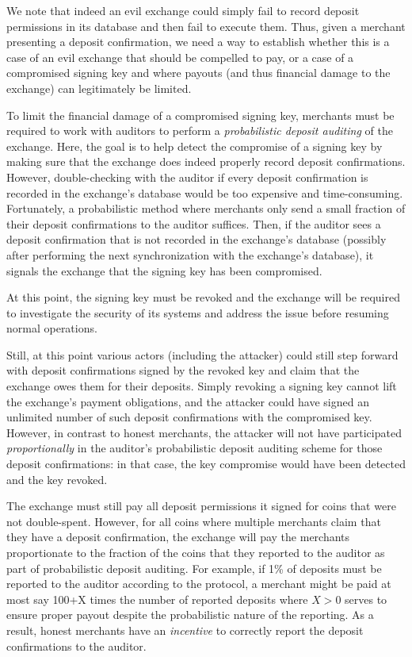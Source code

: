 We note that indeed an evil exchange could simply fail to record
deposit permissions in its database and then fail to execute them.
Thus, given a merchant presenting a deposit confirmation, we need
a way to establish whether this is a case of an evil exchange that
should be compelled to pay, or a case of a compromised signing key
and where payouts (and thus financial damage to the exchange)
can legitimately be limited.

To limit the financial damage of a compromised signing key, merchants
must be required to work with auditors to perform a
\emph{probabilistic deposit auditing} of the exchange.  Here, the goal
is to help detect the compromise of a signing key by making sure that
the exchange does indeed properly record deposit confirmations.
However, double-checking with the auditor if every deposit
confirmation is recorded in the exchange's database would be too
expensive and time-consuming.  Fortunately, a probabilistic method
where merchants only send a small fraction of their deposit
confirmations to the auditor suffices.  Then, if the auditor sees a
deposit confirmation that is not recorded in the exchange's database
(possibly after performing the next synchronization with the
exchange's database), it signals the exchange that the signing key has
been compromised.

At this point, the signing key must be revoked and the exchange will
be required to investigate the security of its systems and address the
issue before resuming normal operations.
%

Still, at this point various actors (including the attacker) could still
step forward with deposit confirmations signed by the revoked key and
claim that the exchange owes them for their deposits.  Simply revoking
a signing key cannot lift the exchange's payment obligations, and the
attacker could have signed an unlimited number of such deposit confirmations
with the compromised key.  However, in contrast to honest merchants, the
attacker will not have participated {\em proportionally} in the auditor's
probabilistic deposit auditing scheme for those deposit confirmations:
in that case, the key compromise would have been detected and the key
revoked.

The exchange must still pay all deposit permissions it signed for
coins that were not double-spent.  However, for all coins where
multiple merchants claim that they have a deposit confirmation, the
exchange will pay the merchants proportionate to the fraction of the
coins that they reported to the auditor as part of probabilistic
deposit auditing.  For example, if 1\% of deposits must be reported to
the auditor according to the protocol, a merchant might be paid at
most say 100+X times the number of reported deposits where $X>0$
serves to ensure proper payout despite the probabilistic nature of the
reporting.  As a result, honest merchants have an {\em incentive} to
correctly report the deposit confirmations to the auditor.


